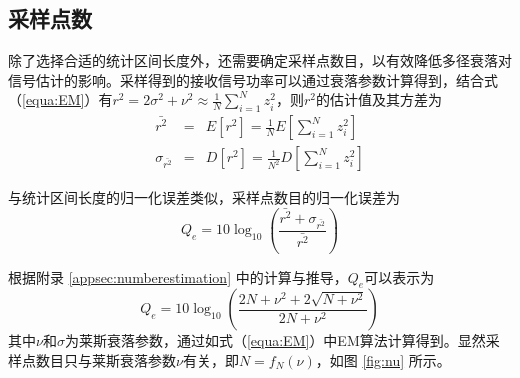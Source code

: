 \begin{figure}[!htp]
  \centering
    \hspace{1cm}
  \hspace{1in}
  \centering
    \hspace{1cm}
\end{figure}

\subsection{采样点数}
\label{sec:number}

除了选择合适的统计区间长度外，还需要确定采样点数目，以有效降低多径衰落对信号估计的影响。采样得到的接收信号功率可以通过衰落参数计算得到，结合式（\ref{equa:EM}）有$r^2=2\sigma^2+\nu^2\approx\frac{1}{N}\sum_{i=1}^N z_i^2$，则$r^2$的估计值及其方差为
\begin{subequations}
  \begin{eqnarray}
    \bar{r^2}&=&E\left[r^2\right]=\frac{1}{N}E\left[\sum_{i=1}^{N}z_i^2\right] \\
    \sigma_{\bar{r^2}}&=&D\left[r^2\right]=\frac{1}{N^2}D\left[\sum_{i=1}^{N}z_i^2\right]
  \end{eqnarray}
\label{equa:number}
\end{subequations}

与统计区间长度的归一化误差类似，采样点数目的归一化误差为
\begin{equation}
Q_e=10 \log_{10}\left(\frac{\bar{r^2}+\sigma_{\bar{r^2}}}{\bar{r^2}}\right)
\label{equa:qerror}
\end{equation}

根据附录 \ref{appsec:numberestimation} 中的计算与推导，$Q_e$可以表示为
\begin{equation}
    Q_e=10 \log_{10}\left(\frac{2N+\nu^2+2\sqrt{N+\nu^2}}{2N+\nu^2}\right)
\label{equa:Qerror}
\end{equation}
其中$\nu$和$\sigma$为莱斯衰落参数，通过如式（\ref{equa:EM}）中EM算法计算得到。显然采样点数目只与莱斯衰落参数$\nu$有关，即$N=f_{N}(\nu)$，如图 \ref{fig:nu} 所示。


